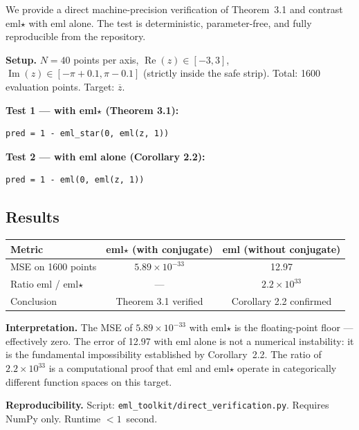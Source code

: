 \documentclass[11pt,a4paper]{article}
\begin{document}
We provide a direct machine-precision verification of Theorem~3.1 and contrast eml$\star$ with eml alone. The test is deterministic, parameter-free, and fully reproducible from the repository.

\textbf{Setup.} $N = 40$ points per axis, $\operatorname{Re}(z) \in [-3, 3]$, $\operatorname{Im}(z) \in [-\pi + 0.1, \pi - 0.1]$ (strictly inside the safe strip). Total: 1600 evaluation points. Target: $\overline{z}$.

\textbf{Test 1 --- with eml$\star$ (Theorem 3.1):}
\begin{verbatim}
pred = 1 - eml_star(0, eml(z, 1))
\end{verbatim}

\textbf{Test 2 --- with eml alone (Corollary 2.2):}
\begin{verbatim}
pred = 1 - eml(0, eml(z, 1))
\end{verbatim}

\subsection{Results}

\begin{table}[h]
\centering
\begin{tabular}{lcc}
\toprule
Metric & eml$\star$ (with conjugate) & eml (without conjugate) \\
\midrule
MSE on 1600 points & $5.89 \times 10^{-33}$ & 12.97 \\
Ratio eml / eml$\star$ & --- & $2.2 \times 10^{33}$ \\
Conclusion & Theorem 3.1 verified & Corollary 2.2 confirmed \\
\bottomrule
\end{tabular}
\end{table}

\textbf{Interpretation.} The MSE of $5.89 \times 10^{-33}$ with eml$\star$ is the floating-point floor --- effectively zero. The error of 12.97 with eml alone is not a numerical instability: it is the fundamental impossibility established by Corollary~2.2. The ratio of $2.2 \times 10^{33}$ is a computational proof that eml and eml$\star$ operate in categorically different function spaces on this target.

\textbf{Reproducibility.} Script: \texttt{eml\_toolkit/direct\_verification.py}. Requires NumPy only. Runtime $< 1$~second.

\end{document}
